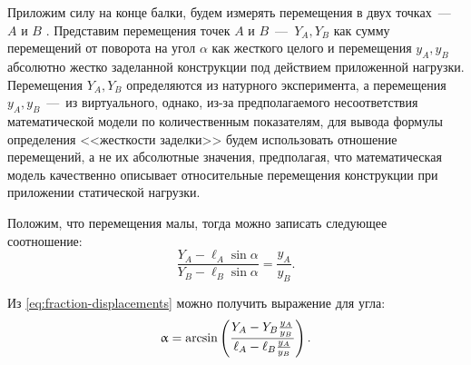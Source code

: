 Приложим силу на конце балки, будем измерять перемещения в двух точках~---~$ A $ и $ B $ . Представим перемещения точек $ A $ и $ B $~---~$ Y_A, Y_B $ как сумму перемещений от поворота на угол $ \alpha $ как жесткого целого и перемещения $ y_A, y_B $ абсолютно жестко заделанной конструкции под действием приложенной нагрузки. Перемещения $ Y_A, Y_B $ определяются из натурного эксперимента, а перемещения $ y_A, y_B $~---~из виртуального, однако, из-за предполагаемого несоответствия математической модели по количественным показателям, для вывода формулы определения <<жесткости заделки>> будем использовать отношение перемещений, а не их абсолютные значения, предполагая, что математическая модель качественно описывает относительные перемещения конструкции при приложении статической нагрузки.

Положим, что перемещения малы, тогда можно записать следующее соотношение:
\begin{equation}
	\frac{Y_A - \ell_A \sin \alpha}{Y_B - \ell_B \sin \alpha} = \frac{y_A}{y_B}.
	\label{eq:fraction-displacements}
\end{equation}

Из \eqref{eq:fraction-displacements} можно получить выражение для угла:
\begin{equation}
	\upalpha = \arcsin \left( \frac{Y_A - Y_B \frac{y_A}{y_B}}{\ell_A - \ell_B \frac{y_A}{y_B}} \right).
	\label{eq:estimated-angle}
\end{equation}

